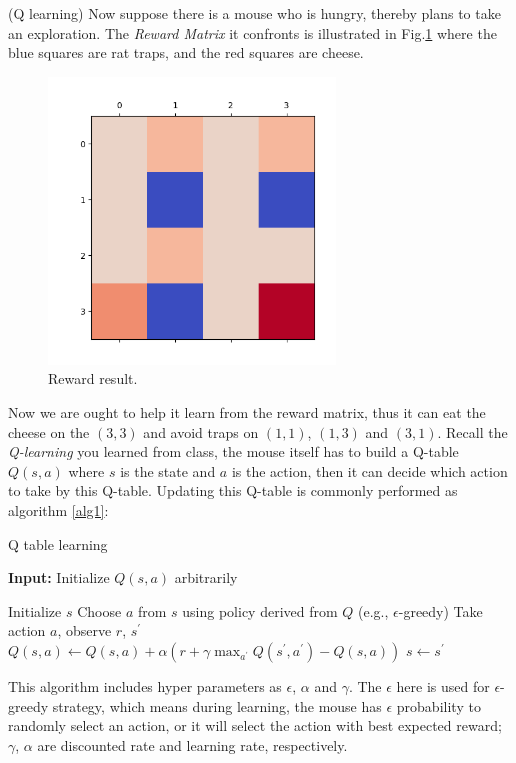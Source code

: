 \documentclass[a4paper, 12pt, answers]{exam}
\begin{document}
\begin{questions}
\question (Q learning) Now suppose there is a mouse who is hungry, thereby plans to take an exploration. The \emph{Reward Matrix} it confronts is illustrated in Fig.\ref{fig1} where the blue squares are rat traps, and the red squares are cheese.  \label{q1}

\begin{figure}[htbp]
\centering
\includegraphics[width=3in]{0.png}
\caption{Reward result.}\label{fig1}
\end{figure}

Now we are ought to help it learn from the reward matrix, thus it can eat the cheese on the $(3,3)$ and avoid traps on $(1,1)$, $(1,3)$ and $(3,1)$. Recall the \emph{Q-learning} you learned from class, the mouse itself has to build a Q-table $Q(s,a)$ where $s$ is the state and $a$ is the action, then it can decide which action to take by this Q-table. Updating this Q-table is commonly performed as algorithm \ref{alg1}:

\begin{algorithm}[b] 
\caption{Q table learning \label{alg1}} %
\hspace*{0.02in} {\bf Input:} %
Initialize $Q(s,a)$ arbitrarily
\begin{algorithmic}[1]
\State Initialize $s$
\State Choose $a$ from $s$ using policy derived from $Q$ (e.g., $\epsilon$-greedy)
\State Take action $a$, observe $r$, $s^{\prime}$
\State $Q(s,a) \gets Q(s,a) + \alpha \left ( r + \gamma \max_{a^{\prime}}Q(s^{\prime},a^{\prime}) - Q(s,a) \right )$
\State $s\gets s^{\prime}$
\EndWhile
\EndFor
\end{algorithmic}
\end{algorithm}
This algorithm includes hyper parameters as $\epsilon$, $\alpha$ and $\gamma$. The $\epsilon$ here is used for $\epsilon$-greedy strategy, which means during learning, the mouse has $\epsilon$ probability to randomly select an action, or it will select the action with best expected reward; $\gamma$, $\alpha$ are discounted rate and learning rate, respectively.


\end{questions}
\end{document}
